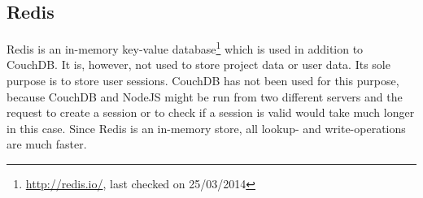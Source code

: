 \subsection{Redis}
\label{backend-technology-redis}

Redis is an in-memory key-value database\footnote{\url{http://redis.io/}, last checked on 25/03/2014} which is used in addition to CouchDB. It is, however, not used to store project data or user data. Its sole purpose is to store user sessions. CouchDB has not been used for this purpose, because CouchDB and NodeJS might be run from two different servers and the request to create a session or to check if a session is valid would take much longer in this case. Since Redis is an in-memory store, all lookup- and write-operations are much faster.